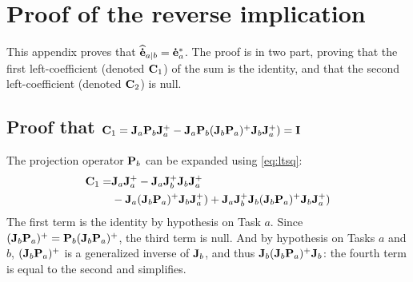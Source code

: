 \documentclass[journal]{IEEEtran}
\begin{document}

%

\appendices
\section{Proof of the reverse implication}
\label{sec:appx}

This appendix proves that ${\mathbf{\widehat{\dot{e}}}}_{a|b} = {\mathbf{\dot{e}}}_{a}^*$. The proof is in two part, proving that the first left-coefficient (denoted ${\mathbf{C}}_1$) of the sum is the identity, and that the second left-coefficient (denoted ${\mathbf{C}}_2$) is null.

\subsection{Proof that ${\mathbf{C}}_1 = {\mathbf{J}}_{a} {\mathbf{P}}_{b} {\mathbf{J}}_{a}^+ - {\mathbf{J}}_{a} {\mathbf{P}}_{b} ({\mathbf{J}}_{b} {\mathbf{P}}_{a} )^+ {\mathbf{J}}_{b} {\mathbf{J}}_{a}^+) = {\mathbf{I}}$}
The projection operator ${\mathbf{P}}_{b}$ can be expanded using \eqref{eq:ltsq}:
\begin{align*}
{\mathbf{C}}_1 =& {\mathbf{J}}_{a} {\mathbf{J}}_{a}^+ -   {\mathbf{J}}_{a} {\mathbf{J}}_{b}^+ {\mathbf{J}}_{b} {\mathbf{J}}_{a}^+ \\
&- {\mathbf{J}}_{a} ({\mathbf{J}}_{b} {\mathbf{P}}_{a} )^+ {\mathbf{J}}_{b} {\mathbf{J}}_{a}^+)  + {\mathbf{J}}_{a} {\mathbf{J}}_{b}^+ {\mathbf{J}}_{b} ({\mathbf{J}}_{b} {\mathbf{P}}_{a} )^+ {\mathbf{J}}_{b} {\mathbf{J}}_{a}^+)
\end{align*}
The first term is the identity by hypothesis on Task $a$. Since $({\mathbf{J}}_{b} {\mathbf{P}}_{a} )^+ = {\mathbf{P}}_{b}({\mathbf{J}}_{b} {\mathbf{P}}_{a} )^+$, the third term is null. And by hypothesis on Tasks $a$ and $b$, $({\mathbf{J}}_{b} {\mathbf{P}}_{a} )^+$ is a generalized inverse of ${\mathbf{J}}_{b}$, and thus ${\mathbf{J}}_{b} ({\mathbf{J}}_{b} {\mathbf{P}}_{a} )^+ {\mathbf{J}}_{b}$: the fourth term is equal to the second and simplifies. \QED
\end{document}
